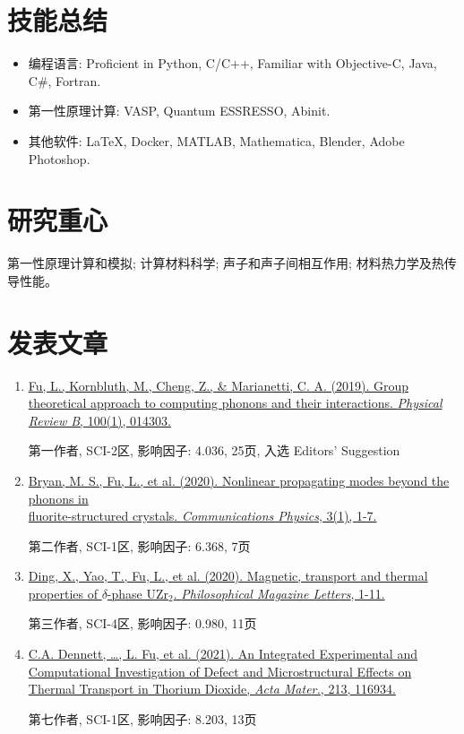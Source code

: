 \documentclass[
  a4paper,
  12pt
]{cv}
\begin{document}
\section{技能总结}
\begin{itemize}
\item
编程语言:   
Proficient in
Python, C/C++, 
Familiar with Objective-C, Java, C\#, Fortran.
\item
第一性原理计算: 
VASP, Quantum ESSRESSO, Abinit.
\item
其他软件:    
{\LaTeX}, 
Docker,
MATLAB, 
Mathematica, 
Blender,
Adobe Photoshop.
\end{itemize}


\section{研究重心}
第一性原理计算和模拟;
计算材料科学;
声子和声子间相互作用;
材料热力学及热传导性能。


\section{发表文章}

\begin{enumerate}
\item
\href{https://doi.org/10.1103/PhysRevB.100.014303}
{\underline{Fu, L.}, Kornbluth, M., Cheng, Z., \& Marianetti, C. A. (2019). 
Group theoretical approach to computing phonons and their interactions. 
\textit{Physical Review B}, 100(1), 014303.}

第一作者, SCI-2区, 影响因子: 4.036, 25页, 入选 Editors' Suggestion
%
\item
\href{https://doi.org/10.1038/s42005-020-00483-2}{
Bryan, M. S., \underline{Fu, L.}, et al. (2020). 
Nonlinear propagating modes beyond the phonons in \\fluorite-structured crystals.
\textit{Communications Physics}, 3(1), 1-7.}

第二作者, SCI-1区, 影响因子: 6.368, 7页
%
\item
\href{https://doi.org/10.1080/09500839.2020.1833375}{
Ding, X., Yao, T., \underline{Fu, L.}, et al. (2020).
Magnetic, transport and thermal properties of $\delta$-phase UZr$_{2}$.
\textit{Philosophical Magazine Letters}, 1-11.}

第三作者, SCI-4区, 影响因子: 0.980, 11页
%
\item
\href{https://doi.org/10.1016/j.actamat.2021.116934}{
C.A. Dennett, \dots, \underline{L. Fu}, et al. (2021).
An Integrated Experimental and Computational Investigation of Defect and Microstructural Effects on Thermal Transport in Thorium Dioxide, %
\textit{Acta Mater.}, 213, 116934.
}

第七作者, SCI-1区, 影响因子: 8.203, 13页
%
\end{enumerate}
\end{document}
